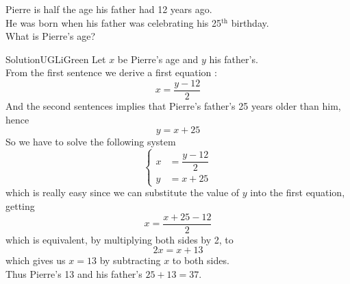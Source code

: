 \documentclass[12pt,a4paper,article,english,firamath]{nsi}
\begin{document}
\begin{exercice}[]
    Pierre is half the age his father had 12 years ago.\\
    He was born when his father was celebrating his 25$^{\text{th}}$ birthday.\\
    
    What is Pierre's age?
\end{exercice}
\begin{encadrecolore}{Solution}{UGLiGreen}
    Let $x$ be Pierre's age and $y$ his father's.\\
    From the first sentence we derive a first equation :
    $$x = \dfrac{y-12}{2}$$
    And the second sentences implies that Pierre's father's 25 years older than him, hence
    $$y = x + 25$$
    So we have to solve the following system
    $$\begin{cases}
         x & = \dfrac{y-12}{2} \\
         y &= x + 25
    \end{cases}$$
    which is really easy since we can substitute the value of $y$ into the first equation, getting
    $$x = \dfrac{x+25-12}{2}$$
    which is equivalent, by multiplying both sides by 2, to
    $$2x = x + 13$$
    which gives us $x=13$ by subtracting $x$ to both sides.\\

    Thus Pierre's 13 and his father's $25+13=37$.
\end{encadrecolore}
\end{document}
